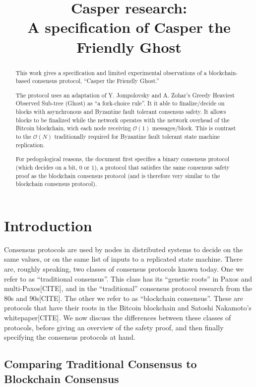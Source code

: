 \documentclass{article}
\theoremstyle{definition}
\begin{document}
\title{Casper research: \\ A specification of Casper the Friendly Ghost}
\maketitle

\begin{abstract}
This work gives a specification and limited experimental observations of a blockchain-based consensus protocol, ``Casper the Friendly Ghost.'' 

The protocol uses an adaptation of Y. Jompolovsky and A. Zohar's Greedy Heaviest Observed Sub-tree (Ghost) as ``a fork-choice rule''. It it able to finalize/decide on blocks with asynchronous and Byzantine fault tolerant consensus safety. It allows blocks to be finalized while the network operates with the network overhead of the Bitcoin blockchain, wich each node receiving $\mathcal{O}(1)$ messages/block. This is contrast to the $\mathcal{O}(N)$ traditionally required for Byzantine fault tolerant state machine replication.

For pedogological reasons, the document first specifies a binary consensus protocol (which decides on a bit, $0$ or $1$), a protocol that satisfies the same consensus safety proof as the blockchain consensus protocol (and is therefore very similar to the blockchain consensus protocol). 
\end{abstract}

\section{Introduction}

Consensus protocols are used by nodes in distributed systems to decide on the same values, or on the same list of inputs to a replicated state machine. There are, roughly speaking, two classes of consensus protocols known today. One we refer to as ``traditional consensus''. This class has its ``genetic roots'' in Paxos and multi-Paxos[CITE], and in the ``traditional'' consensus protocol research from the 80s and 90s[CITE]. The other we refer to as ``blockchain consensus''. These are protocols that have their roots in the Bitcoin blockchain and Satoshi Nakamoto's whitepaper[CITE].  We now discuss the differences between these classes of protocols, before giving an overview of the safety proof, and then finally specifying the consensus protocols at hand.

\subsection{Comparing Traditional Consensus to Blockchain Consensus}
\end{document}
